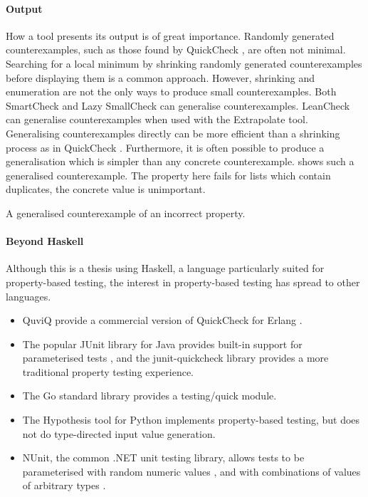\paragraph{Output}
How a tool presents its output is of great importance.  Randomly
generated counterexamples, such as those found by
QuickCheck \parencite{claessen2000}, are often not minimal.  Searching for a
local minimum by shrinking randomly generated counterexamples before
displaying them is a common approach.  However, shrinking and
enumeration are not the only ways to produce small counterexamples.
Both SmartCheck \parencite{pike2014} and Lazy SmallCheck \parencite{runciman2008}
can generalise counter\-examples.  LeanCheck \parencite{leancheck} can
generalise counterexamples when used with the
Extrapolate \parencite{braquehais2017ifl} tool.  Generalising
counterexamples directly can be more efficient than a shrinking
process as in QuickCheck \parencite{pike2014}.  Furthermore, it is often
possible to produce a generalisation which is simpler than any
concrete counterexample.   shows such a generalised
counterexample.  The property here fails for lists which contain
duplicates, the concrete value is unimportant.

\begin{listing}
\centering
{}
\caption{A generalised counterexample of an incorrect property.}\label{lst:gencntr}
\end{listing}

\paragraph{Beyond Haskell}
Although this is a thesis using Haskell, a language particularly
suited for property-based testing, the interest in property-based
testing has spread to other languages.

\begin{itemize}
\item QuviQ provide a commercial version of QuickCheck for
  Erlang \parencite{arts2006}.
\item The popular JUnit library for Java provides built-in support for
  parameterised tests \parencite{parameterized_tests}, and the
  junit-quickcheck \parencite{junit_quickcheck} library provides a more
  traditional property testing experience.
\item The Go standard library provides a
  testing/quick \parencite{testing_quick} module.
\item The Hypothesis \parencite{hypothesis_python} tool for Python
  implements property-based testing, but does not do type-directed
  input value generation.
\item NUnit, the common .NET unit testing library, allows tests to be
  parameterised with random numeric values \parencite{random_attribute}, and with
  combinations of values of arbitrary types \parencite{values_attribute}.
\end{itemize}

